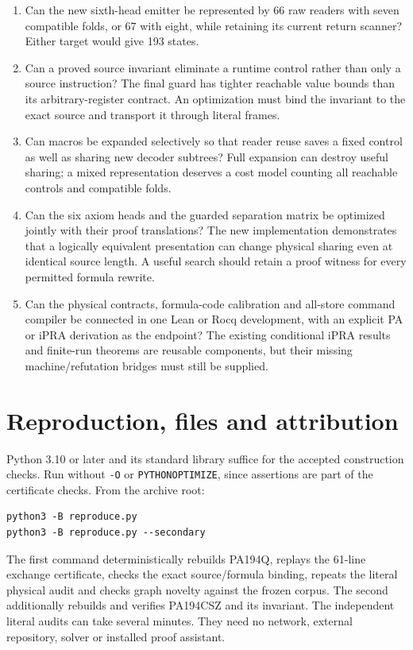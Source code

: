 \documentclass[11pt,letterpaper]{article}
\newcommand{\file}[1]{\texttt{\nolinkurl{#1}}}
\begin{document}
\begin{enumerate}
\item Can the new sixth-head emitter be represented by 66 raw readers with
seven compatible folds, or 67 with eight, while retaining its current
return scanner? Either target would give 193 states.
\item Can a proved source invariant eliminate a runtime control rather than
only a source instruction? The final guard has tighter reachable value
bounds than its arbitrary-register contract. An optimization must bind the
invariant to the exact source and transport it through literal frames.
\item Can macros be expanded selectively so that reader reuse saves a fixed
control as well as sharing new decoder subtrees? Full expansion can destroy
useful sharing; a mixed representation deserves a cost model counting all
reachable controls and compatible folds.
\item Can the six axiom heads and the guarded separation matrix be optimized
jointly with their proof translations? The new implementation demonstrates
that a logically equivalent presentation can change physical sharing even
at identical source length. A useful search should retain a proof witness
for every permitted formula rewrite.
\item Can the physical contracts, formula-code calibration and all-store
command compiler be connected in one Lean or Rocq development, with an
explicit PA or iPRA derivation as the endpoint? The existing conditional
iPRA results and finite-run theorems are reusable components, but their
missing machine/refutation bridges must still be supplied.
\end{enumerate}

\section{Reproduction, files and attribution}

Python 3.10 or later and its standard library suffice for the accepted
construction checks. Run without \file{-O} or \file{PYTHONOPTIMIZE}, since
assertions are part of the certificate checks. From the archive root:
\begin{verbatim}
python3 -B reproduce.py
python3 -B reproduce.py --secondary
\end{verbatim}
The first command deterministically rebuilds PA194Q, replays the 61-line
exchange certificate, checks the exact source/formula binding, repeats the
literal physical audit and checks graph novelty against the frozen corpus.
The second additionally rebuilds and verifies PA194CSZ and its invariant.
The independent literal audits can take several minutes. They need no
network, external repository, solver or installed proof assistant.
\end{document}
